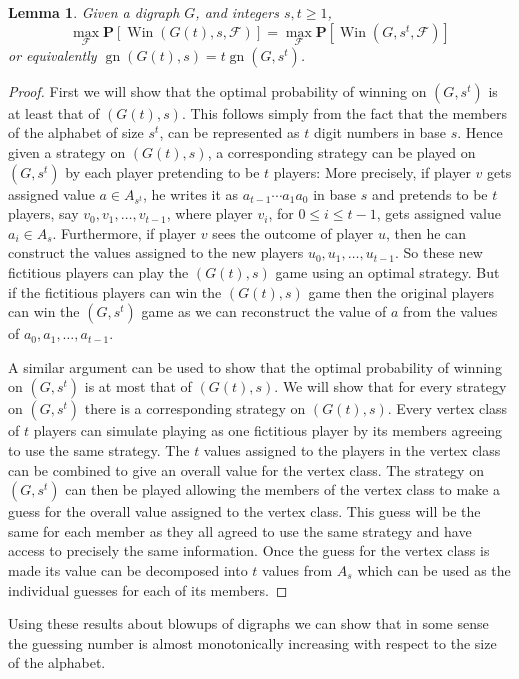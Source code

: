 \documentclass[a4paper, 14pt]{extarticle}
\theoremstyle{plain}
\newtheorem{lemma}[proposition]{Lemma}
\def\mc{\mathcal}
\def\mb{\mathbf}
\DeclareMathOperator{\gn}{gn}
\DeclareMathOperator{\Win}{Win}
\begin{document}
\begin{lemma}\label{Lem:BlowupEqual}
Given a digraph $G$, and integers $s, t\geq 1$,
\[
\max_{\mc{F}}\mb{P}[\Win(G(t),s,\mc{F})] =
\max_{\mc{F}}\mb{P}[\Win(G,s^t,\mc{F})]
\]
or equivalently $\gn(G(t),s) = t\gn(G,s^t)$.
\end{lemma}

\begin{proof}
First we will show that the optimal probability of winning on
$(G,s^t)$ is at least that of $(G(t),s)$. This follows simply from
the fact that the members of the alphabet of size $s^t$, can be
represented as $t$ digit numbers in base $s$. Hence given a strategy
on $(G(t),s)$, a corresponding strategy can be played on $(G,s^t)$ by
each player pretending to be $t$ players: More precisely, if player $v$ gets assigned value $a \in A_{s^t}$, he writes it as $a_{t-1} \cdots a_1a_0$ in base $s$ and pretends to be $t$ players, say $v_0,v_1,\ldots,v_{t-1}$, where player $v_i$, for $0 \leq i \leq t-1$, gets assigned value $a_i \in A_s$. Furthermore, if player $v$ sees the outcome of player $u$, then he can construct the values assigned to the new players $u_0,u_1,\ldots,u_{t-1}$. So these new fictitious players can play the $(G(t),s)$ game using an optimal strategy. But if the fictitious players can win the $(G(t),s)$ game then the original players can win the $(G,s^t)$ game as we can reconstruct the value of $a$ from the values of $a_0,a_1,\ldots,a_{t-1}$.

A similar argument can be used to show that the optimal probability
of winning on $(G,s^t)$ is at most that of $(G(t),s)$. We will show
that for every strategy on $(G,s^t)$ there is a corresponding
strategy on $(G(t),s)$. Every vertex class of $t$ players can
simulate playing as one fictitious player by its members agreeing to
use the same strategy. The $t$ values assigned to the players in the
vertex class can be combined to give an overall value for the vertex
class. The strategy on $(G,s^t)$ can then be played allowing the
members of the vertex class to make a guess for the overall value
assigned to the vertex class. This guess will be the same for each
member as they all agreed to use the same strategy and have access
to precisely the same information. Once the guess for the vertex
class is made its value can be decomposed into $t$ values from $A_s$
which can be used as the individual guesses for each of its members.
\end{proof}

Using these results about blowups of digraphs we can show that
in some sense the guessing number is almost monotonically increasing
with respect to the size of the alphabet.
\end{document}

